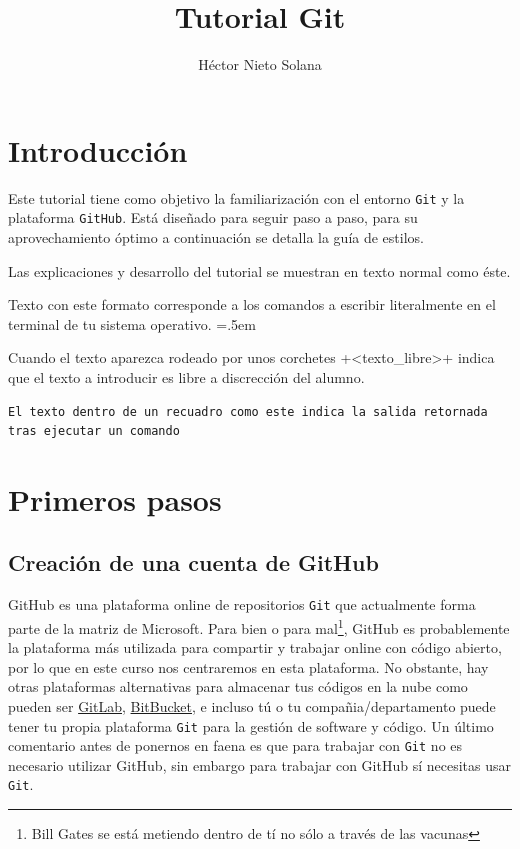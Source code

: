 \documentclass[a4paper,10pt]{article}
\title{Tutorial Git}
\author{Héctor Nieto Solana}
\newenvironment{cverbatim}
 {\SaveVerbatim{cverb}}
 {\endSaveVerbatim
  \flushleft\fboxrule=0pt\fboxsep=.5em
  \colorbox{bg}{\BUseVerbatim{cverb}}%
  \endflushleft
}
\begin{document}
 \maketitle
 \section{Introducción}
  Este tutorial tiene como objetivo la familiarización con el entorno \verb+Git+ y la plataforma \verb+GitHub+. Está diseñado para seguir paso a paso, para su aprovechamiento óptimo a continuación se detalla la guía de estilos.
 
  Las explicaciones y desarrollo del tutorial se muestran en texto normal como éste.
 
  \begin{cverbatim}
Texto con este formato corresponde a los comandos a escribir
literalmente en el terminal de tu sistema operativo. 
  \end{cverbatim}

  Cuando el texto aparezca rodeado por unos corchetes \cverb+<texto_libre>+ indica que el texto a introducir es libre a discrección del alumno.
  
  \begin{lstlisting}[style=custom, caption=Ejemplo de salida retornada por un comando]
El texto dentro de un recuadro como este indica la salida retornada tras ejecutar un comando
  \end{lstlisting} 


 \section{Primeros pasos}

  \subsection{Creación de una cuenta de GitHub}\label{sec:github_login}
    GitHub es una plataforma online de repositorios \verb+Git+ que actualmente forma parte de la matriz de Microsoft. Para bien o para mal\footnote{Bill Gates se está metiendo dentro de tí no sólo a través de las vacunas}, GitHub es probablemente la plataforma más utilizada para compartir y trabajar online con código abierto, por lo que en este curso nos centraremos en esta plataforma. No obstante, hay otras plataformas alternativas para almacenar tus códigos en la nube como pueden ser \href{https://about.gitlab.com}{GitLab}, \href{https://bitbucket.org}{BitBucket}, e incluso tú o tu compañia/departamento puede tener tu propia plataforma \verb+Git+ para la gestión de software y código. Un último comentario antes de ponernos en faena es que para trabajar con \verb+Git+ no es necesario utilizar GitHub, sin embargo para trabajar con GitHub sí necesitas usar \verb+Git+. 
    
\end{document}
